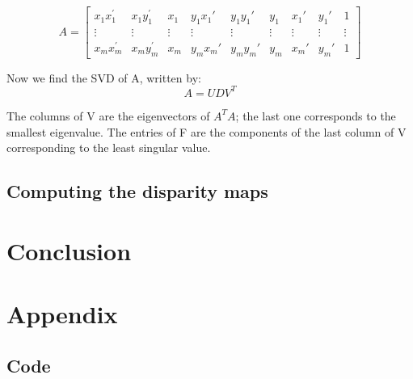 \documentclass[letterpaper,11pt]{article}
\begin{document}
\[
A = \begin{bmatrix} x_{1}x_{1}^{'} & x_{1}y_{1}^{'} & x_{1} & y_{1}x_{1}' & y_{1}y_{1}' & y_{1} & x_{1}' & y_{1}'& 1  \\ \vdots & \vdots & \vdots &\vdots &\vdots & \vdots & \vdots & \vdots &\vdots\\ x_{m}x_{m}^{'} & x_{m}y_{m}^{'} & x_{m} & y_{m}x_{m}' & y_{m}y_{m}' & y_{m} & x_{m}' & y_{m}'& 1 \end{bmatrix}
\]

Now we find the SVD of A, written by:
\[
A = UDV^{T}
\]

The columns of V are the eigenvectors of $A^{T}A$; the last one corresponds to the smallest eigenvalue. The entries of F are the components of the last column of V corresponding to the least singular value.

\subsection{Computing the disparity maps}


\section{Conclusion}


\section{Appendix}

\subsection{Code}
\end{document}
